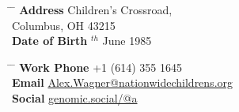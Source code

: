 \documentclass[10pt]{article} %
\begin{document}
\parbox{0.5\textwidth}{ %
\begin{tabbing} %
\hspace{3cm} \= \hspace{4cm} \= \kill %
{\bf Address}  Children's Crossroad,\\ %
\> Columbus, OH 43215 \\ %
{\bf Date of Birth} $^{th}$ June 1985 \\ %
\end{tabbing}}
\hfill %
\parbox{0.5\textwidth}{ %
\begin{tabbing} %
\hspace{3cm} \= \hspace{4cm} \= \kill %
{\bf Work Phone} \> +1 (614) 355 1645 \\ %
{\bf Email} \> \href{mailto:Alex.Wagner@nationwidechildrens.org}{Alex.Wagner@nationwidechildrens.org} \\ %
{\bf Social} \> \href{https://genomic.social/@a}{genomic.social/@a}
 
\end{tabbing}}
\end{document}
